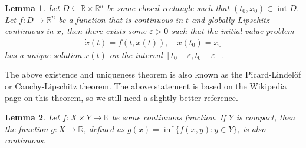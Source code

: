 \documentclass[a4paper]{article}
\theoremstyle{definition}
\theoremstyle{plain}
\newtheorem{lemma}{Lemma\hspace{0.25em}\ignorespaces}
\DeclareMathOperator{\interior}{int}
\begin{document}
\begin{lemma}\label{lemma:picard}
  Let $D \subseteq \mathbb{R} \times \mathbb{R}^{n}$ be some closed rectangle such that
  $(t_{0}, x_{0}) \in \interior D$.
  Let $f : D \rightarrow \mathbb{R}^{n}$ be a function that is continuous in $t$
  and globally Lipschitz continuous in $x$, then there exists some $\varepsilon > 0$
  such that the initial value problem
  \begin{align}
    \label{eq:1}
    \dot{x}(t) = f(t, x(t)), \quad x(t_{0}) = x_{0}
  \end{align}
  has a unique solution $x(t)$ on the interval
  $[t_{0} - \varepsilon, t_{0} + \varepsilon]$.
\end{lemma}

{\color{Navy} The above existence and uniqueness theorem is also known as the
  Picard-Lindel{\"o}f or Cauchy-Lipschitz theorem. The above statement is based
  on the Wikipedia page on this theorem, so we still need a slightly better
  reference.}

\begin{lemma}\label{lemma:inf-continuous}
  Let $f : X \times Y \rightarrow \mathbb{R}$ be some continuous function. If
  $Y$ is compact, then the function $g : X \rightarrow \mathbb{R}$, defined as
  $g(x) = \inf \{ f(x,y) : y\in Y\}$, is also continuous.
\end{lemma}
\end{document}
